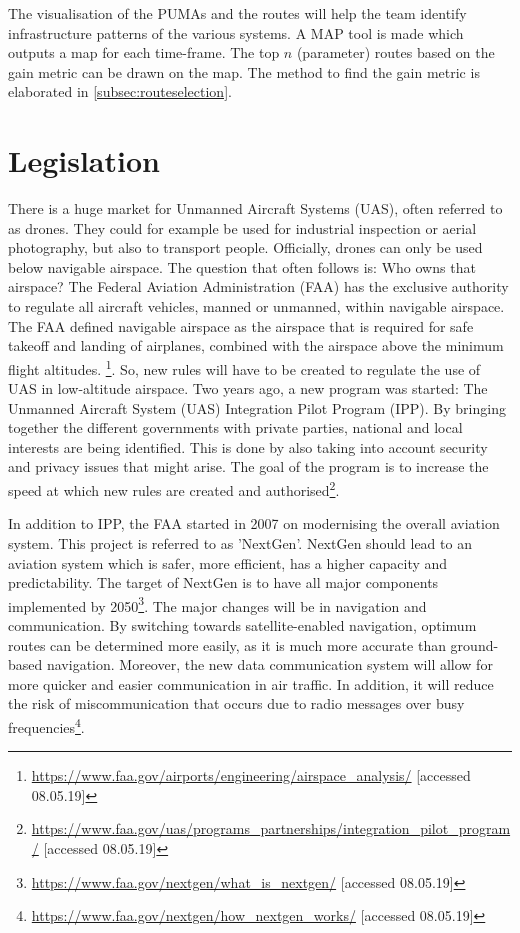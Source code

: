The visualisation of the PUMAs and the routes will help the team identify infrastructure patterns of the various systems. A MAP tool is made which outputs a map for each time-frame. The top $n$ (parameter) routes based on the gain metric can be drawn on the map. The method to find the gain metric is elaborated in \autoref{subsec:routeselection}. 

\section{Legislation}
\label{legislation}
There is a huge market for Unmanned Aircraft Systems (UAS), often referred to as drones. They could for example be used for industrial inspection or aerial photography, but also to transport people. Officially, drones can only be used below navigable airspace. The question that often follows is: Who owns that airspace? The Federal Aviation Administration (FAA) has the exclusive authority to regulate all aircraft vehicles, manned or unmanned, within navigable airspace. The FAA defined navigable airspace as the airspace that is required for safe takeoff and landing of airplanes, combined with the airspace above the minimum flight altitudes. \footnote{\url{https://www.faa.gov/airports/engineering/airspace_analysis/} [accessed 08.05.19]}. So, new rules will have to be created to regulate the use of UAS in low-altitude airspace. Two years ago, a new program was started: The Unmanned Aircraft System (UAS) Integration Pilot Program (IPP). By bringing together the different governments with private parties, national and local interests are being identified. This is done by also taking into account security and privacy issues that might arise. The goal of the program is to increase the speed at which new rules are created and authorised\footnote{\url{https://www.faa.gov/uas/programs_partnerships/integration_pilot_program/} [accessed 08.05.19]}.

In addition to IPP, the FAA started in 2007 on modernising the overall aviation system. This project is referred to as 'NextGen'. NextGen should lead to an aviation system which is safer, more efficient, has a higher capacity and predictability. The target of NextGen is to have all major components implemented by 2050\footnote{\url{https://www.faa.gov/nextgen/what_is_nextgen/} [accessed 08.05.19]}. The major changes will be in navigation and communication. By switching towards satellite-enabled navigation, optimum routes can be determined more easily, as it is much more accurate than ground-based navigation. Moreover, the new data communication system will allow for more quicker and easier communication in air traffic. In addition, it will reduce the risk of miscommunication that occurs due to radio messages over busy frequencies\footnote{\url{https://www.faa.gov/nextgen/how_nextgen_works/} [accessed 08.05.19]}.

